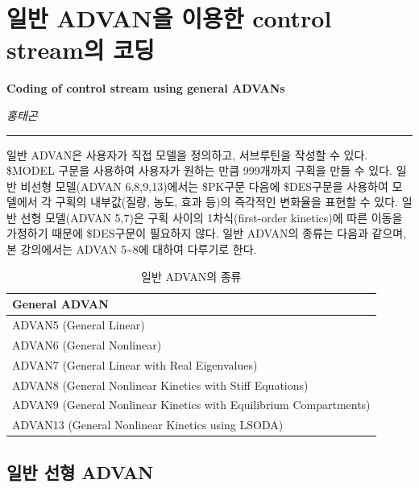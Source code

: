 \documentclass[
  10pt,
]{krantz}
\begin{document}
\hypertarget{uxc77cuxbc18-advanuxc744-uxc774uxc6a9uxd55c-control-streamuxc758-uxcf54uxb529}{%
\chapter{일반 ADVAN을 이용한 control stream의 코딩}\label{uxc77cuxbc18-advanuxc744-uxc774uxc6a9uxd55c-control-streamuxc758-uxcf54uxb529}}

\textbf{Coding of control stream using general ADVANs}

\emph{홍태곤}

\begin{center}\rule{0.5\linewidth}{0.5pt}\end{center}

일반 ADVAN은 사용자가 직접 모델을 정의하고, 서브루틴을 작성할 수 있다. \$MODEL 구문을 사용하여 사용자가 원하는 만큼
999개까지 구획을 만들 수 있다. 일반 비선형 모델(ADVAN 6,8,9,13)에서는 \$PK구문 다음에 \$DES구문을 사용하여
모델에서 각 구획의 내부값(질량, 농도, 효과 등)의 즉각적인 변화율을 표현할 수 있다. 일반 선형 모델(ADVAN 5,7)은
구획 사이의 1차식(first-order kinetics)에 따른 이동을 가정하기 때문에 \$DES구문이 필요하지 않다. 일반
ADVAN의 종류는 다음과 같으며, 본 강의에서는 ADVAN 5\textasciitilde8에 대하여 다루기로 한다.

\begin{table}

\caption{\label{tab:gen-advan}일반 ADVAN의 종류}
\centering
\begin{tabular}[t]{l}
\hline
General ADVAN\\
\hline
ADVAN5 (General Linear)\\
\hline
ADVAN6 (General Nonlinear)\\
\hline
ADVAN7 (General Linear with Real Eigenvalues)\\
\hline
ADVAN8 (General Nonlinear Kinetics with Stiff Equations)\\
\hline
ADVAN9 (General Nonlinear Kinetics with Equilibrium Compartments)\\
\hline
ADVAN13 (General Nonlinear Kinetics using LSODA)\\
\hline
\end{tabular}
\end{table}

\hypertarget{uxc77cuxbc18-uxc120uxd615-advan}{%
\section{일반 선형 ADVAN}\label{uxc77cuxbc18-uxc120uxd615-advan}}
\end{document}
